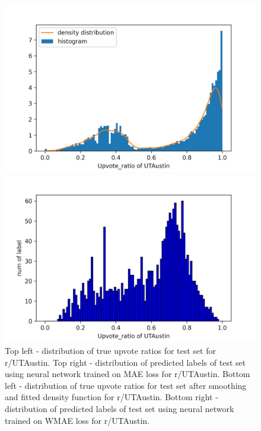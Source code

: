 \documentclass[11pt,a4paper]{article}
\begin{document}
\begin{figure}
        \begin{minipage}{0.5\textwidth}
            \includegraphics[width=\textwidth]{utaustin_task2true_smooth.png}
        \end{minipage}
        \begin{minipage}{0.5\textwidth}
            \includegraphics[width=\textwidth]{utaustin_task2pred_smooth.png}
        \end{minipage}

        \caption{
            Top left - distribution of true upvote ratios for test set for r/UTAustin.
            Top right - distribution of predicted labels of test set using neural network trained on MAE loss for r/UTAustin.
            Bottom left - distribution of true upvote ratios for test set after smoothing and fitted density function for r/UTAustin.
            Bottom right - distribution of predicted labels of test set using neural network trained on WMAE loss for r/UTAustin.
        }
    \end{figure}
\end{document}
